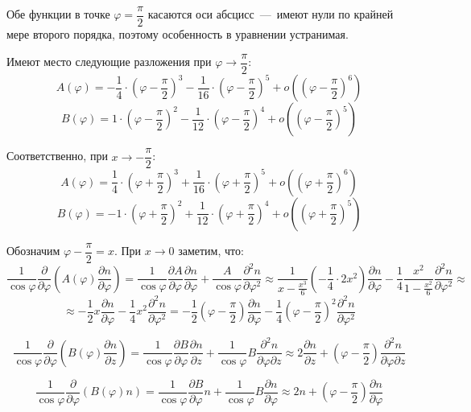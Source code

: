 \documentclass[2pt, a4paper, fleqn]{extarticle}
\begin{document}
Обе функции в точке $\varphi = \dfrac{\pi}{2}$ касаются оси абсцисс~---~имеют нули по крайней мере второго порядка, поэтому особенность в уравнении устранимая.

Имеют место следующие разложения при $\varphi\rightarrow\dfrac{\pi}{2}$: $$A(\varphi)=-\dfrac{1}{4}\cdot\left(\varphi-\dfrac{\pi}{2}\right)^3-\dfrac{1}{16}\cdot\left(\varphi-\dfrac{\pi}{2}\right)^5+o\left(\left(\varphi-\dfrac{\pi}{2}\right)^6\right)$$ $$B(\varphi) = 1\cdot\left(\varphi-\dfrac{\pi}{2}\right)^2-\dfrac{1}{12}\cdot \left(\varphi-\dfrac{\pi}{2}\right)^4+o\left(\left(\varphi-\dfrac{\pi}{2}\right)^5\right)$$

Соответственно, при $x\rightarrow-\dfrac{\pi}{2}$: $$A(\varphi)=\dfrac{1}{4}\cdot\left(\varphi+\dfrac{\pi}{2}\right)^3+\dfrac{1}{16}\cdot\left(\varphi+\dfrac{\pi}{2}\right)^5+o\left(\left(\varphi+\dfrac{\pi}{2}\right)^6\right)$$ $$B(\varphi) = -1\cdot\left(\varphi+\dfrac{\pi}{2}\right)^2+\dfrac{1}{12}\cdot \left(\varphi+\dfrac{\pi}{2}\right)^4+o\left(\left(\varphi+\dfrac{\pi}{2}\right)^5\right)$$



Обозначим $\varphi-\dfrac{\pi}{2} = x$. При $x\rightarrow 0$ заметим, что: $$\dfrac{1}{\cos\varphi}\dfrac{\partial}{\partial\varphi}\left(A(\varphi)\dfrac{\partial n}{\partial\varphi}\right) = \dfrac{1}{\cos\varphi}\dfrac{\partial A}{\partial\varphi}\dfrac{\partial n}{\partial\varphi} + \dfrac{A}{\cos\varphi}\dfrac{\partial^2 n}{\partial\varphi^2} \approx \dfrac{1}{x-\frac{x^3}{6}}\left(-\dfrac14\cdot 2x^2\right)\dfrac{\partial n}{\partial\varphi} - \dfrac14\dfrac{x^2}{1-\frac{x^2}{6}}\dfrac{\partial^2 n}{\partial\varphi^2}\approx$$ $$\approx -\dfrac12x\dfrac{\partial n}{\partial\varphi}-\dfrac14x^2\dfrac{\partial^2 n}{\partial\varphi^2}=-\dfrac12\left(\varphi-\dfrac{\pi}{2}\right)\dfrac{\partial n}{\partial\varphi}-\dfrac14\left(\varphi-\dfrac{\pi}{2}\right)^2\dfrac{\partial^2 n}{\partial\varphi^2}$$

$$\dfrac{1}{\cos\varphi}\dfrac{\partial}{\partial\varphi}\left(B(\varphi)\dfrac{\partial n}{\partial z}\right) = \dfrac{1}{\cos\varphi}\dfrac{\partial B}{\partial\varphi}\dfrac{\partial n}{\partial z} + \dfrac{1}{\cos\varphi}B\dfrac{\partial^2 n}{\partial \varphi\partial z} \approx 2\dfrac{\partial n}{\partial z}+\left(\varphi-\dfrac{\pi}{2}\right)\dfrac{\partial^2 n}{\partial \varphi\partial z}$$

$$\dfrac{1}{\cos\varphi}\dfrac{\partial}{\partial\varphi}\left(B(\varphi)n\right) = \dfrac{1}{\cos\varphi}\dfrac{\partial B}{\partial\varphi}n + \dfrac{1}{\cos\varphi}B\dfrac{\partial n}{\partial \varphi} \approx 2n+\left(\varphi-\dfrac{\pi}{2}\right)\dfrac{\partial n}{\partial \varphi}$$
\end{document}

